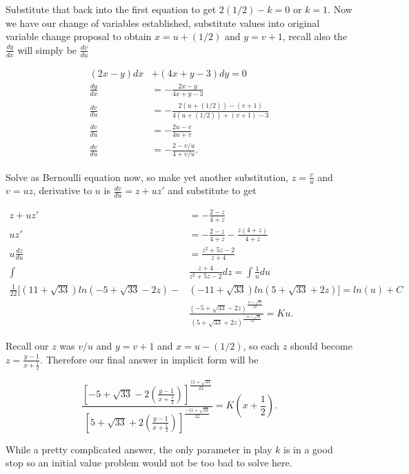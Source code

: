 \documentclass[12pt]{article}
\begin{document}
Substitute that back into the first equation to get $2(1/2)-k=0$ or $k=1$. Now we have our change of variables established, substitute values into original variable change proposal to obtain $x=u+(1/2)$ and $y=v+1$, recall also the $\frac{dy}{dx}$ will simply be $\frac{dv}{du}$

\begin{align*}
    (2x-y)dx&+(4x+y-3)dy=0 \\
    \frac{dy}{dx} &= -\frac{2x-y}{4x+y-3} \\
    \frac{dv}{du} &= -\frac{2(u+(1/2))-(v+1)}{4(u+(1/2))+(v+1)-3} \\
    \frac{dv}{du} &= -\frac{2u-v}{4u+v} \\
    \frac{dv}{du} &= -\frac{2-v/u}{4+v/u}.
\end{align*}

Solve as Bernoulli equation now, so make yet another substitution, $z=\frac{v}{u}$ and $v=uz$, derivative to $u$ is $\frac{dv}{du}=z+uz'$ and substitute to get 

\begin{align*}
    z+uz' &= -\frac{2-z}{4+z} \\
    uz' &= -\frac{2-z}{4+z}-\frac{z(4+z)}{4+z} \\
    u\frac{dz}{du} &= \frac{z^2+5z-2}{z+4} \\
    \int &\frac{z+4}{z^2+5z-2}dz = \int \frac{1}{u} du \\
    \frac{1}{22} [(11 + \sqrt{33}) ln(-5 + \sqrt{33} - 2 z) - &(-11 + \sqrt{33}) ln(5 + \sqrt{33} + 2z)] = ln(u)+C \\
    & \frac{(-5+\sqrt{33}-2z)^{\frac{11+\sqrt{33}}{22}}}{(5+\sqrt{33}+2z)^{\frac{-11+\sqrt{33}}{22}}} = Ku.
\end{align*}

Recall our $z$ was $v/u$ and $y=v+1$ and $x=u-(1/2)$, so each $z$ should become $z=\frac{y-1}{x+\frac{1}{2}}$. Therefore our final answer in implicit form will be

\begin{equation*}
    \frac{\left[-5+\sqrt{33}-2\left(\frac{y-1}{x+\frac{1}{2}}\right)\right]^{\frac{11+\sqrt{33}}{22}}}{\left[5+\sqrt{33}+2\left(\frac{y-1}{x+\frac{1}{2}}\right)\right]^{\frac{-11+\sqrt{33}}{22}}} = K\left(x+\frac{1}{2}\right).
\end{equation*}

While a pretty complicated answer, the only parameter in play $k$ is in a good stop so an initial value problem would not be too bad to solve here.

\pagebreak
\end{document}
